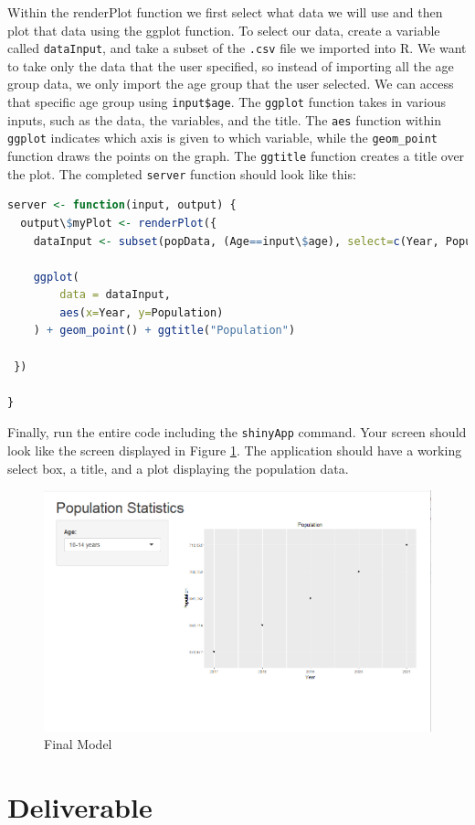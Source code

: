 Within the renderPlot function we first select what data we will use and then plot that data using the ggplot function.
To select our data, create a variable called \texttt{dataInput}, and take a subset of the \texttt{.csv} file we imported into R.
We want to take only the data that the user specified, so instead of importing all the age group data, we only import the age group that the user selected.
We can access that specific age group using \texttt{input\$age}.
The \texttt{ggplot} function takes in various inputs, such as the data, the variables, and the title.
The \texttt{aes} function within \texttt{ggplot} indicates which axis is given to which variable, while the \texttt{geom\_point} function draws the points on the graph.
The \texttt{ggtitle} function creates a title over the plot.
The completed \texttt{server} function should look like this: 
\begin{lstlisting}[language = R]
server <- function(input, output) {
  output\$myPlot <- renderPlot({
    dataInput <- subset(popData, (Age==input\$age), select=c(Year, Population, State))
    
    ggplot(
        data = dataInput, 
        aes(x=Year, y=Population)
    ) + geom_point() + ggtitle("Population")
    
 })
  
}
\end{lstlisting}
Finally, run the entire code including the \texttt{shinyApp} command.
Your screen should look like the screen displayed in Figure \ref{fig:example}.
The application should have a working select box, a title, and a plot displaying the population data.
\begin{figure}[htbp!]
   \centering
   \includegraphics[width = .5\textwidth]{pictures/shiny/pop.PNG} 
   \caption{Final Model}
   \label{fig:example}
\end{figure}

\section{Deliverable}

